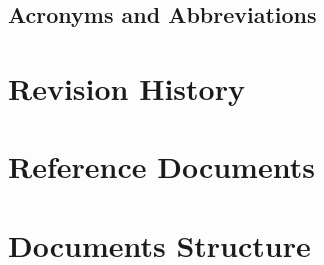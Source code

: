 \subsection{Acronyms and Abbreviations}
\printglossary

\section{Revision History}

\section{Reference Documents}

\section{Documents Structure}